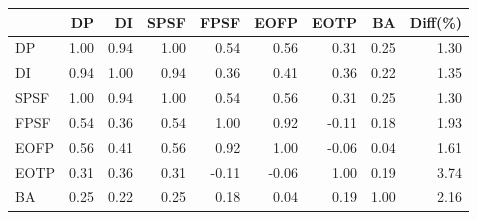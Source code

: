 \begin{tabular}{l|rrrrrrr|r}
\toprule
 & DP & DI & SPSF & FPSF & EOFP & EOTP & BA & Diff(\%)  \\
\midrule
DP & 1.00 & 0.94 & 1.00 & 0.54 & 0.56 & 0.31 & 0.25 & 1.30  \\
DI & 0.94 & 1.00 & 0.94 & 0.36 & 0.41 & 0.36 & 0.22 & 1.35  \\
SPSF & 1.00 & 0.94 & 1.00 & 0.54 & 0.56 & 0.31 & 0.25 & 1.30  \\
FPSF & 0.54 & 0.36 & 0.54 & 1.00 & 0.92 & -0.11 & 0.18 & 1.93  \\
EOFP & 0.56 & 0.41 & 0.56 & 0.92 & 1.00 & -0.06 & 0.04 & 1.61  \\
EOTP & 0.31 & 0.36 & 0.31 & -0.11 & -0.06 & 1.00 & 0.19 & 3.74  \\
BA & 0.25 & 0.22 & 0.25 & 0.18 & 0.04 & 0.19 & 1.00 & 2.16  \\
\bottomrule
\end{tabular}

